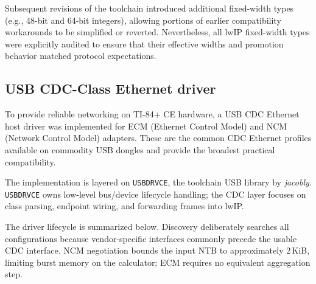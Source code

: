 \documentclass[titlepage]{report}
\begin{document}
		Subsequent revisions of the toolchain introduced additional fixed-width types (e.g., 48-bit and 64-bit integers), allowing portions of earlier compatibility workarounds to be simplified or reverted. Nevertheless, all lwIP fixed-width types were explicitly audited to ensure that their effective widths and promotion behavior matched protocol expectations.
		
		\subsection{USB CDC-Class Ethernet driver}
		To provide reliable networking on TI-84+ CE hardware, a USB CDC Ethernet host driver was implemented for ECM (Ethernet Control Model) and NCM (Network Control Model) adapters. These are the common CDC Ethernet profiles available on commodity USB dongles and provide the broadest practical compatibility.

		The implementation is layered on \texttt{USBDRVCE}, the toolchain USB library by \textit{jacobly}. \texttt{USBDRVCE} owns low-level bus/device lifecycle handling; the CDC layer focuses on class parsing, endpoint wiring, and forwarding frames into lwIP.

		The driver lifecycle is summarized below. Discovery deliberately searches all configurations because vendor-specific interfaces commonly precede the usable CDC interface. NCM negotiation bounds the input NTB to approximately 2\,KiB, limiting burst memory on the calculator; ECM requires no equivalent aggregation step.
\end{document}
